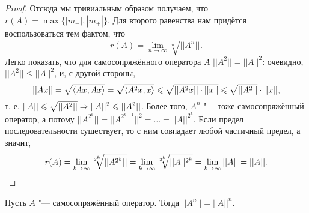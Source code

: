 \documentclass[main]{subfiles}
\begin{document}
\begin{proof}
  Отсюда мы тривиальным образом получаем,
  что \( r(A) = \max \{ |m_-|, |m_+| \} \).
  Для второго равенства нам придётся воспользоваться
  тем фактом, что
  \[
    r(A) = \lim_{n\to\infty} \sqrt[n]{||A^n||}.
  \]
  Легко показать, что
  для самосопряжённого оператора \( A \)
  \( ||A^2|| = ||A||^2 \):
  очевидно, \( ||A^2|| \le ||A||^2 \),
  и, с другой стороны,
  \[
    ||A x|| = \sqrt{\langle Ax, Ax \rangle} =
    \sqrt{\langle A^2 x, x \rangle} \leqslant
    \sqrt{||A^2 x|| \cdot ||x||} \leqslant
    \sqrt{||A^2||} \cdot ||x||,
  \]
  т. е. \( ||A|| \leqslant \sqrt{||A^2||} \Rightarrow
  ||A||^2 \leqslant ||A^2|| \).
  Более того, \( A^n \) "--- тоже самосопряжённый
  оператор, а потому
  \( ||A^{2^k}|| = ||A^{2^{k-1}}||^2 = \dots =
  ||A||^{2^k} \).
  Если предел последовательности существует,
  то с ним совпадает любой частичный предел,
  а значит,
  \[
    r(A) = \lim_{k \to \infty} \sqrt[2^k]{||A^{2^k}||} =
    \lim_{k \to \infty} \sqrt[2^k]{||A||^{2^k}} =
    \lim_{k \to \infty} ||A|| = ||A||. \qedhere
  \]
\end{proof}

\begin{exercise}
  Пусть \( A \) "--- самосопряжённый оператор.
  Тогда
  \( ||A^n|| = ||A||^n \).
\end{exercise}
\end{document}
